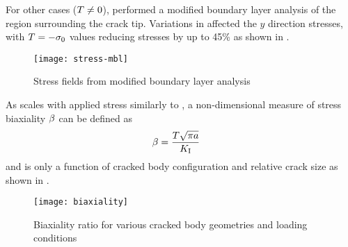 For other cases (\(T \neq 0\)), \citet{cr5970} performed a modified boundary layer analysis of the region surrounding the crack tip.
Variations in \T affected the \(y\) direction stresses, with \(T=-\sigma_0 \) values reducing stresses by up to 45\% as shown in .
\begin{figure}
\centering
\texttt{[image: stress-mbl]}
\caption[Stress fields from modified boundary layer analysis]{\label{fig:mbl} Stress fields from modified boundary layer analysis \citep{anderson2005}}
\end{figure}
As \T scales with applied stress similarly to \KI, a non-dimensional measure of stress biaxiality \(\beta\) can be defined as
\begin{align}
\beta &= \frac{T \sqrt{\pi a}}{K_\textnormal{I}}
\end{align}
and is only a function of cracked body configuration and relative crack size as shown in .
\begin{figure}
\centering
\texttt{[image: biaxiality]}
\caption[Biaxiality ratio for various cracked body geometries and loading conditions]{\label{fig:biaxiality} Biaxiality ratio for various cracked body geometries and loading conditions \citep{anderson2005}}
\end{figure}

